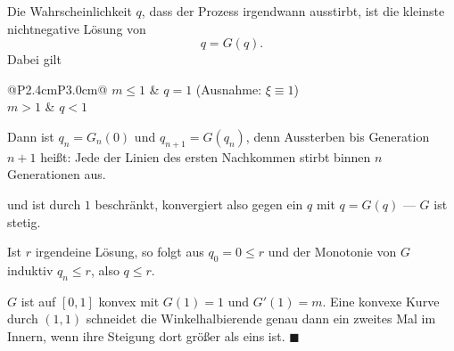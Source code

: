 \begin{merksatz}
Die Wahrscheinlichkeit $q$, dass der Prozess irgendwann ausstirbt, ist die kleinste nichtnegative Lösung von
\[ q = G(q) . \]
Dabei gilt
\begin{center}
{\small
\renewcommand{\arraystretch}{1.5}
\begin{tabular}{@{}P{2.4cm}P{3.0cm}@{}}
\toprule
$m \le 1$ & $q = 1$ (Ausnahme: $\xi \equiv 1$)\\
$m > 1$ & $q < 1$\\
\bottomrule
\end{tabular}}
\end{center}

 Dann ist $q_n = G_n(0)$ und $q_{n+1} = G(q_n)$, denn Aussterben bis Generation $n+1$ heißt: Jede der Linien des ersten Nachkommen stirbt binnen $n$ Generationen aus.

 und ist durch $1$ beschränkt, konvergiert also gegen ein $q$ mit $q = G(q)$ --- $G$ ist stetig.

 Ist $r$ irgendeine Lösung, so folgt aus $q_0 = 0 \le r$ und der Monotonie von $G$ induktiv $q_n \le r$, also $q \le r$.

 $G$ ist auf $[0,1]$ konvex mit $G(1) = 1$ und $G'(1) = m$. Eine konvexe Kurve durch $(1,1)$ schneidet die Winkelhalbierende genau dann ein zweites Mal im Innern, wenn ihre Steigung dort größer als eins ist. $\blacksquare$

\begin{center}
\end{center}
\end{merksatz}

